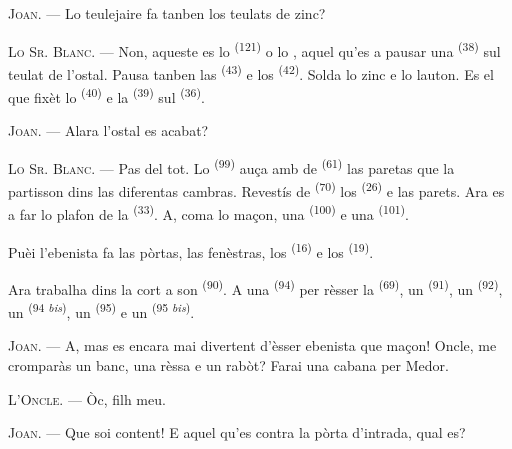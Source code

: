 \textsc{Joan}. --- Lo teulejaire fa tanben los teulats de zinc?

\textsc{Lo Sr. Blanc}. --- Non, aqueste es lo 
\textsuperscript{(121)} o lo , aquel qu'es a pausar una
 \textsuperscript{(38)} sul teulat de l'ostal. Pausa tanben las
 \textsuperscript{(43)} e los 
\textsuperscript{(42)}. Solda lo zinc e lo lauton. Es el que fixèt lo
 \textsuperscript{(40)} e la 
\textsuperscript{(39)} sul  \textsuperscript{(36)}.

\textsc{Joan}. --- Alara l'ostal es acabat?

\VUsaut{3.0mm}
\VUsaut{3.0mm}

\textsc{Lo Sr. Blanc}. --- Pas del tot. Lo 
\textsuperscript{(99)} auça amb de  \textsuperscript{(61)} las
paretas que la partisson dins las diferentas cambras. Revestís de 
\textsuperscript{(70)} los  \textsuperscript{(26)} e las parets.
Ara es a far lo plafon de la  \textsuperscript{(33)}. A, coma lo
maçon, una  \textsuperscript{(100)} e una 
\textsuperscript{(101)}.

Puèi l'ebenista fa las pòrtas, las fenèstras, los 
\textsuperscript{(16)} e los  \textsuperscript{(19)}.

Ara trabalha dins la cort a son  \textsuperscript{(90)}. A
una  \textsuperscript{(94)} per rèsser la 
\textsuperscript{(69)}, un  \textsuperscript{(91)}, un
 \textsuperscript{(92)}, un 
\textsuperscript{(94 \textit{bis})}, un  \textsuperscript{(95)} e
un  \textsuperscript{(95 \textit{bis})}.

\textsc{Joan}. --- A, mas es encara mai divertent d'èsser ebenista que maçon!
Oncle, me cromparàs un banc, una rèssa e un rabòt? Farai una cabana per Medor.

\textsc{L'Oncle}. --- Òc, filh meu.

\textsc{Joan}. --- Que soi content! E aquel qu'es contra la pòrta d'intrada, qual
es?

\VUsaut{3.0mm}
\VUsaut{3.0mm}

